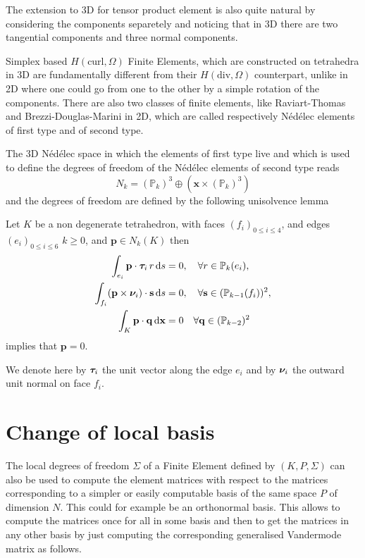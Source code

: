 \begin{remark}
The extension to 3D for tensor product element is also quite natural by considering the components separetely and noticing that in 3D there are two tangential components and three normal components.

Simplex based $H(\textrm{curl}, \Omega)$ Finite Elements, which are constructed on tetrahedra in 3D are fundamentally different from   their $H(\textrm{div}, \Omega)$ counterpart, unlike in 2D where one could go from one to the other by a simple rotation of the components. There are also two classes of finite elements, like Raviart-Thomas and Brezzi-Douglas-Marini in 2D, which are called respectively N\'ed\'elec elements of first type and of second type.

The 3D N\'ed\'elec space in which the elements of first type live and which is used to define the degrees of freedom of the N\'ed\'elec elements of second type reads
\begin{equation}\label{nedelec3D}
N_k= ( \mathbb{P}_k)^3 \oplus \left( \mathbf{x}\times ( \mathbb{P}_k)^3 \right)
\end{equation}
and the degrees of freedom are defined by the following unisolvence lemma
\begin{lemma} Let $K$ be a non degenerate tetrahedron, with faces $(f_i)_{0\leq i \leq 4}$, and edges
$(e_i)_{0\leq i \leq 6}$
$k\geq 0$, and $ \mathbf{p}\in N_k(K)$ then
\begin{align}
\int_{e_i} \mathbf{p}\cdot \boldsymbol{\tau}_i \,r \,{\rm d} s &=0, \quad \forall r\in \mathbb{P}_k(e_i), \label{eq:Ne3d}\\
\int_{f_i} (\mathbf{p}\times \boldsymbol{\nu}_i) \cdot \mathbf{s} \,{\rm d} s &=0, \quad \forall  \mathbf{s}\in (\mathbb{P}_{k-1}(f_i))^2, \label{eq:Nf1}\\
\int_K \mathbf{p}  \cdot \mathbf{q} \,{\rm d} \mathbf{x} &=0 \quad\forall \mathbf{q} \in (\mathbb{P}_{k-2})^2
\label{eq:Nt}
\end{align}
implies that $ \mathbf{p}=0$.
\end{lemma}
We denote here by $\boldsymbol{\tau}_i$ the unit vector along the edge $e_i$ and by $ \boldsymbol{\nu}_i$ the outward unit normal on face $f_i$.
\end{remark}

\section{Change of local basis}

The local degrees of freedom $\Sigma$ of a Finite Element defined by $(K,P,\Sigma)$ can also be used to compute the element matrices with respect to the matrices corresponding to a simpler or easily computable basis of the same space $P$ of dimension $N$. This could for example be an orthonormal basis.
This allows to compute the matrices once for all in some basis and then to get the matrices in any other basis by just computing the corresponding generalised Vandermode matrix as follows.

